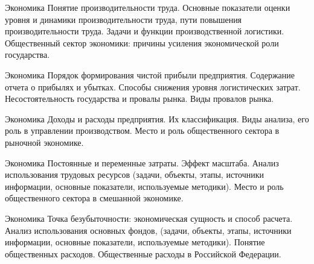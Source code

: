 \documentclass[
	11pt,
	a4paper,
	]
	{article}
\begin{document}
\vfill



\begin{minipage}[t][\miniH]{\miniL}\centering
	 {Экономика}
		{
			Понятие производительности труда. Основные показатели оценки уровня и динамики производительности труда, пути повышения производительности труда.
		}{
			Задачи и функции производственной логистики.
		}{
			Общественный сектор экономики: причины усиления экономической роли государства.
		}
	\lowGE
\end{minipage}

\vfill



\begin{minipage}[t][\miniH]{\miniL}\centering
	 {Экономика}
		{
			Порядок формирования чистой прибыли предприятия. Содержание отчета о прибылях и убытках.
		}{
			Способы снижения уровня логистических затрат.
		}{
			Несостоятельность государства и провалы рынка. Виды провалов рынка.
		}
	\lowGE
\end{minipage}





\begin{minipage}[t][\miniH]{\miniL}\centering
	 {Экономика}
		{
			Доходы и расходы предприятия. Их классификация.
		}{
			Виды анализа, его роль в управлении производством.
		}{
			Место и роль общественного сектора в рыночной экономике.
		}
	\lowGE
\end{minipage}

\vfill



\begin{minipage}[t][\miniH]{\miniL}\centering
	 {Экономика}
		{
			Постоянные и переменные затраты. Эффект масштаба.
		}{
			Анализ использования трудовых ресурсов (задачи, объекты, этапы, источники информации, основные показатели, используемые методики).
		}{
			Место и роль общественного сектора в смешанной экономике.
		}
	\lowGE
\end{minipage}

\vfill



\begin{minipage}[t][\miniH]{\miniL}\centering
	 {Экономика}
		{
			Точка безубыточности: экономическая сущность и способ расчета.
		}{
			Анализ использования основных фондов, (задачи, объекты, этапы, источники информации, основные показатели, используемые методики).
		}{
			Понятие общественных расходов. Общественные расходы в Российской Федерации.
		}
	\lowGE
\end{minipage}
\end{document}
